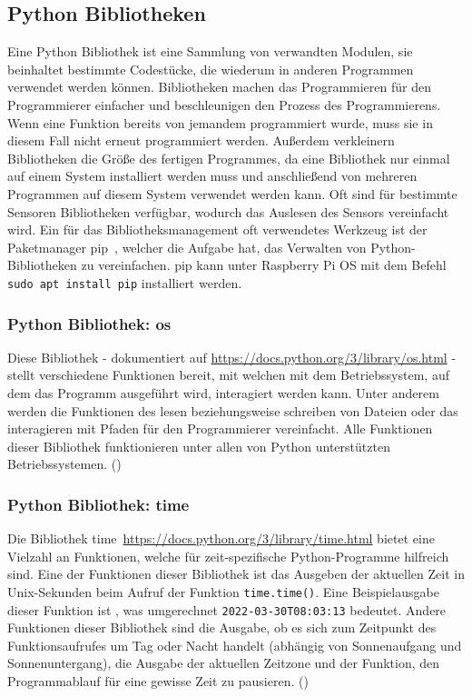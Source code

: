 \subsection{Python Bibliotheken}
\label{subsec:tLibPython}
Eine Python Bibliothek ist eine Sammlung von verwandten Modulen, sie beinhaltet bestimmte Codestücke, die wiederum in anderen Programmen verwendet werden können. Bibliotheken machen das Programmieren für den Programmierer einfacher und beschleunigen den Prozess des Programmierens. Wenn eine Funktion bereits von jemandem programmiert wurde, muss sie in diesem Fall nicht erneut programmiert werden. Außerdem verkleinern Bibliotheken die Größe des fertigen Programmes, da eine Bibliothek nur einmal auf einem System installiert werden muss und anschließend von mehreren Programmen auf diesem System verwendet werden kann. Oft sind für bestimmte Sensoren Bibliotheken verfügbar, wodurch das Auslesen des Sensors vereinfacht wird. Ein für das Bibliotheksmanagement oft verwendetes Werkzeug ist der Paketmanager \glqq pip\grqq\ , welcher die Aufgabe hat, das Verwalten von Python-Bibliotheken zu vereinfachen. pip kann unter Raspberry Pi OS mit dem Befehl \verb|sudo apt install pip| installiert werden.

\subsubsection{Python Bibliothek: os}
\label{subsubsec:tLibOs}
Diese Bibliothek - dokumentiert auf \url{https://docs.python.org/3/library/os.html} - stellt verschiedene Funktionen bereit, mit welchen mit dem Betriebssystem, auf dem das Programm ausgeführt wird, interagiert werden kann. Unter anderem werden die Funktionen des lesen beziehungsweise schreiben von Dateien oder das interagieren mit Pfaden für den Programmierer vereinfacht. Alle Funktionen dieser Bibliothek funktionieren unter allen von Python unterstützten Betriebssystemen.
(\cite{PythonDocs})

\subsubsection{Python Bibliothek: time}
\label{subsubsec:tLibTime}
Die Bibliothek \glqq time\grqq\ \url{https://docs.python.org/3/library/time.html} bietet eine Vielzahl an Funktionen, welche für zeit-spezifische Python-Programme hilfreich sind. Eine der Funktionen dieser Bibliothek ist das Ausgeben der aktuellen Zeit in Unix-Sekunden beim Aufruf der Funktion \verb|time.time()|. Eine Beispielausgabe dieser Funktion ist \grqq , was umgerechnet \verb|2022-03-30T08:03:13| bedeutet. Andere Funktionen dieser Bibliothek sind die Ausgabe, ob es sich zum Zeitpunkt des Funktionsaufrufes um Tag oder Nacht handelt (abhängig von Sonnenaufgang und Sonnenuntergang), die Ausgabe der aktuellen Zeitzone und der Funktion, den Programmablauf für eine gewisse Zeit zu pausieren.
(\cite{PythonDocs})

